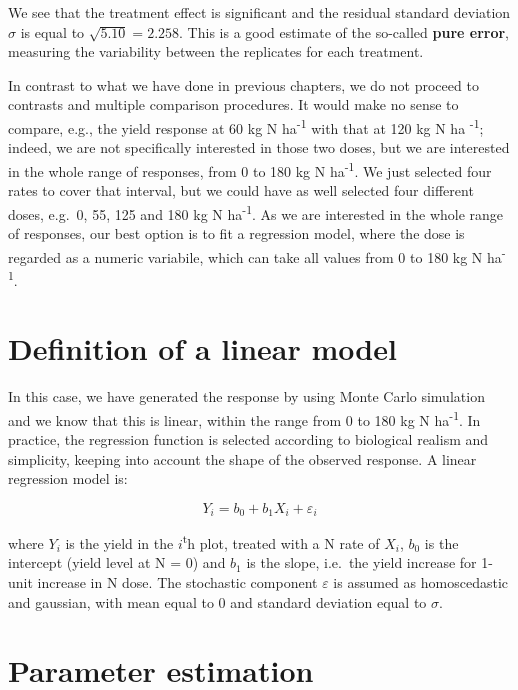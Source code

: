 \documentclass[a4paper,12pt,oneside]{book}
\begin{document}
We see that the treatment effect is significant and the residual standard deviation \(\sigma\) is equal to \(\sqrt{5.10} = 2.258\). This is a good estimate of the so-called \textbf{pure error}, measuring the variability between the replicates for each treatment.

In contrast to what we have done in previous chapters, we do not proceed to contrasts and multiple comparison procedures. It would make no sense to compare, e.g., the yield response at 60 kg N ha\textsuperscript{-1} with that at 120 kg N ha \textsuperscript{-1}; indeed, we are not specifically interested in those two doses, but we are interested in the whole range of responses, from 0 to 180 kg N ha\textsuperscript{-1}. We just selected four rates to cover that interval, but we could have as well selected four different doses, e.g.~0, 55, 125 and 180 kg N ha\textsuperscript{-1}. As we are interested in the whole range of responses, our best option is to fit a regression model, where the dose is regarded as a numeric variabile, which can take all values from 0 to 180 kg N ha\textsuperscript{-1}.

\hypertarget{definition-of-a-linear-model}{%
\section{Definition of a linear model}\label{definition-of-a-linear-model}}

In this case, we have generated the response by using Monte Carlo simulation and we know that this is linear, within the range from 0 to 180 kg N ha\textsuperscript{-1}. In practice, the regression function is selected according to biological realism and simplicity, keeping into account the shape of the observed response. A linear regression model is:

\[Y_i = b_0 + b_1 X_i + \varepsilon_i\]

where \(Y_i\) is the yield in the \(i\)\textsuperscript{t}h plot, treated with a N rate of \(X_i\), \(b_0\) is the intercept (yield level at N = 0) and \(b_1\) is the slope, i.e.~the yield increase for 1-unit increase in N dose. The stochastic component \(\varepsilon\) is assumed as homoscedastic and gaussian, with mean equal to 0 and standard deviation equal to \(\sigma\).

\hypertarget{parameter-estimation-2}{%
\section{Parameter estimation}\label{parameter-estimation-2}}
\end{document}
